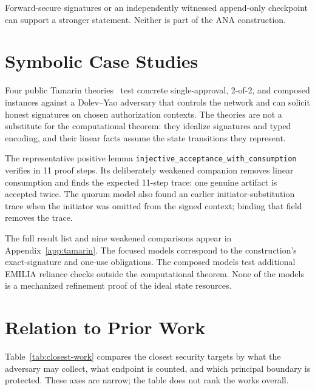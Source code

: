 \documentclass[10pt]{article}
\newcommand{\code}[1]{\texttt{#1}}
\begin{document}
Forward-secure signatures or an independently witnessed append-only checkpoint
can support a stronger statement. Neither is part of the ANA construction.

\section{Symbolic Case Studies}
\label{sec:symbolic}

Four public Tamarin theories~\cite{tamarin} test concrete single-approval, 2-of-2, and composed
instances against a Dolev--Yao adversary that controls the network and can solicit
honest signatures on chosen authorization contexts. The theories are not a
substitute for the computational theorem: they idealize signatures and typed
encoding, and their linear facts assume the state transitions they represent.

The representative positive lemma
\code{injective\_acceptance\_with\_consumption} verifies in 11 proof steps. Its
deliberately weakened companion removes linear consumption and finds the
expected 11-step trace: one genuine artifact is accepted twice. The quorum
model also found an earlier initiator-substitution trace when the initiator was
omitted from the signed context; binding that field removes the trace.

The full result list and nine weakened comparisons appear in
Appendix~\ref{app:tamarin}. The focused models correspond to the construction's
exact-signature and one-use obligations. The composed models test additional
EMILIA reliance checks outside the computational theorem. None of the models is
a mechanized refinement proof of the ideal state resources.

\section{Relation to Prior Work}
\label{sec:related}

Table~\ref{tab:closest-work} compares the closest security targets by what the
adversary may collect, what endpoint is counted, and which principal boundary
is protected. These axes are narrow; the table does not rank the works overall.
\end{document}
